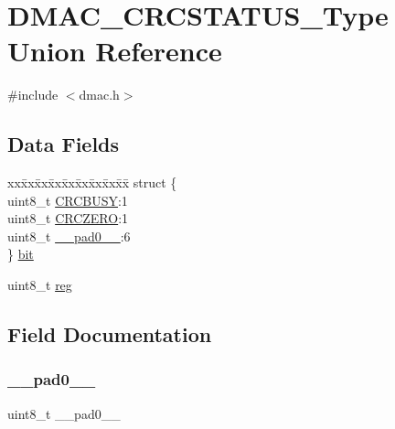\hypertarget{union_d_m_a_c___c_r_c_s_t_a_t_u_s___type}{}\section{D\+M\+A\+C\+\_\+\+C\+R\+C\+S\+T\+A\+T\+U\+S\+\_\+\+Type Union Reference}
\label{union_d_m_a_c___c_r_c_s_t_a_t_u_s___type}


{\ttfamily \#include $<$dmac.\+h$>$}

\subsection*{Data Fields}
\begin{DoxyCompactItemize}
\item 
\begin{tabbing}
xx\=xx\=xx\=xx\=xx\=xx\=xx\=xx\=xx\=\kill
struct \{\\
\>uint8\_t \mbox{\hyperlink{union_d_m_a_c___c_r_c_s_t_a_t_u_s___type_a5227891b8e080651b741ba2d9c40263d}{CRCBUSY}}:1\\
\>uint8\_t \mbox{\hyperlink{union_d_m_a_c___c_r_c_s_t_a_t_u_s___type_a2fa8c53a85d3677fc7f208bfd742e74c}{CRCZERO}}:1\\
\>uint8\_t \mbox{\hyperlink{union_d_m_a_c___c_r_c_s_t_a_t_u_s___type_a8b4eebe79ded0459acec2f4950102ba3}{\_\_pad0\_\_}}:6\\
\} \mbox{\hyperlink{union_d_m_a_c___c_r_c_s_t_a_t_u_s___type_ada1e90869cb34f733223ef5b44bf25ba}{bit}}\\

\end{tabbing}\item 
uint8\+\_\+t \mbox{\hyperlink{union_d_m_a_c___c_r_c_s_t_a_t_u_s___type_a9428adc9af4653a2050e2536b55dec8d}{reg}}
\end{DoxyCompactItemize}


\subsection{Field Documentation}
\mbox{\label{union_d_m_a_c___c_r_c_s_t_a_t_u_s___type_a8b4eebe79ded0459acec2f4950102ba3}} 
\subsubsection{\texorpdfstring{\_\_pad0\_\_}{\_\_pad0\_\_}}
{\footnotesize\ttfamily uint8\+\_\+t \+\_\+\+\_\+pad0\+\_\+\+\_\+}

